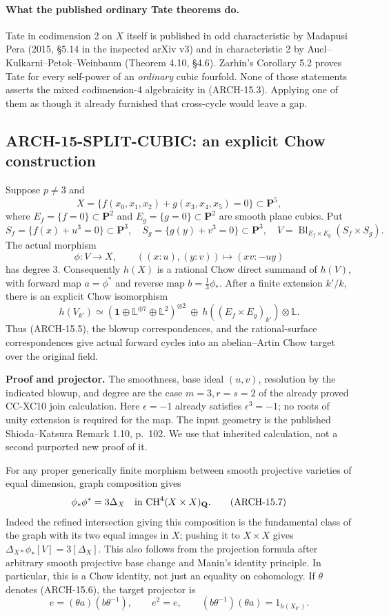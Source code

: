 \paragraph{What the published ordinary Tate theorems do.}
Tate in codimension 2 on \(X\) itself is published in odd characteristic
by Madapusi Pera (2015, \S5.14 in the inspected arXiv v3) and in
characteristic 2 by Auel--Kulkarni--Petok--Weinbaum (Theorem 4.10,
\S4.6). Zarhin's Corollary 5.2 proves Tate for every self-power of an
\emph{ordinary} cubic fourfold. None of those statements asserts the
mixed codimension-4 algebraicity in (ARCH-15.3). Applying one of them as
though it already furnished that cross-cycle would leave a gap.

\subsection{ARCH-15-SPLIT-CUBIC: an explicit Chow construction}

Suppose \(p\ne3\) and
\[
 X=\{f(x_0,x_1,x_2)+g(x_3,x_4,x_5)=0\}\subset\mathbf P^5,
 \tag{ARCH-15.4}
\]
where \(E_f=\{f=0\}\subset\mathbf P^2\) and
\(E_g=\{g=0\}\subset\mathbf P^2\) are smooth plane cubics. Put
\[
 S_f=\{f(x)+u^3=0\}\subset\mathbf P^3,
 \quad S_g=\{g(y)+v^3=0\}\subset\mathbf P^3,
 \quad V=\operatorname{Bl}_{E_f\times E_g}(S_f\times S_g).
\]
The actual morphism
\[
 \phi:V\longrightarrow X,
 \qquad ((x:u),(y:v))\longmapsto(xv:-uy)
 \tag{ARCH-15.5}
\]
has degree 3. Consequently \(h(X)\) is a rational Chow direct summand
of \(h(V)\), with forward map \(a=\phi^*\) and reverse map
\(b=\frac13\phi_*\). After a finite extension \(k'/k\), there is an
explicit Chow isomorphism
\[
 h(V_{k'})\simeq
 (\mathbf1\oplus\mathbb L^{\oplus7}\oplus\mathbb L^2)^{\otimes2}
 \ \oplus\ h((E_f\times E_g)_{k'})\otimes\mathbb L.
 \tag{ARCH-15.6}
\]
Thus (ARCH-15.5), the blowup correspondences, and the rational-surface
correspondences give actual forward cycles into an abelian--Artin Chow
target over the original field.

\textbf{Proof and projector.} The smoothness, base ideal \((u,v)\),
resolution by the indicated blowup, and degree are the case
\(m=3,r=s=2\) of the already proved CC-XC10 join calculation. Here
\(\epsilon=-1\) already satisfies \(\epsilon^3=-1\); no roots of unity
extension is required for the map. The input geometry is the published
Shioda--Katsura Remark 1.10, p.~102. We use that inherited calculation,
not a second purported new proof of it.

For any proper generically finite morphism between smooth projective
varieties of equal dimension, graph composition gives
\[
 \phi_*\phi^*=3\Delta_X\quad\hbox{in }
 \mathrm{CH}^4(X\times X)_{\mathbf Q}.
 \tag{ARCH-15.7}
\]
Indeed the refined intersection giving this composition is the
fundamental class of the graph with its two equal images in \(X\);
pushing it to \(X\times X\) gives
\(\Delta_{X*}\phi_*[V]=3[\Delta_X]\). This also follows from the
projection formula after arbitrary smooth projective base change and
Manin's identity principle. In particular, this is a Chow identity,
not just an equality on cohomology. If \(\theta\) denotes (ARCH-15.6),
the target projector is
\[
 e=(\theta a)(b\theta^{-1}),\qquad
 e^2=e,\qquad (b\theta^{-1})(\theta a)=1_{h(X_{k'})}.
 \tag{ARCH-15.8}
\]

